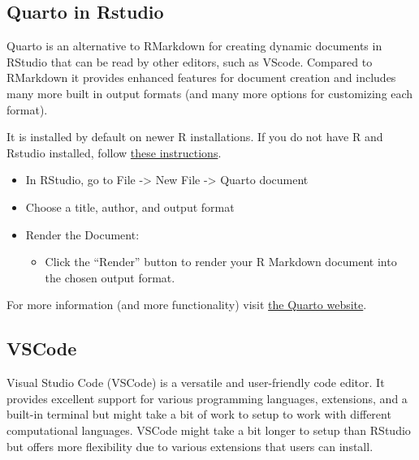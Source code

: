 \documentclass[
  letterpaper,
  DIV=11,
  numbers=noendperiod]{scrreprt}
\providecommand{\tightlist}{%
  \setlength{\itemsep}{0pt}\setlength{\parskip}{0pt}}
\begin{document}
\subsection{Quarto in Rstudio}\label{quarto-in-rstudio}

Quarto is an alternative to RMarkdown for creating dynamic documents in
RStudio that can be read by other editors, such as VScode. Compared to
RMarkdown it provides enhanced features for document creation and
includes many more built in output formats (and many more options for
customizing each format).

It is installed by default on newer R installations. If you do not have
R and Rstudio installed, follow
\href{https://rstudio-education.github.io/hopr/starting.html}{these
instructions}.

\begin{itemize}
\tightlist
\item
  In RStudio, go to File -\textgreater{} New File -\textgreater{} Quarto
  document
\item
  Choose a title, author, and output format
\item
  Render the Document:

  \begin{itemize}
  \tightlist
  \item
    Click the ``Render'' button to render your R Markdown document into
    the chosen output format.
  \end{itemize}
\end{itemize}

For more information (and more functionality) visit
\href{https://quarto.org/docs/get-started/hello/rstudio.html}{the Quarto
website}.

\subsection{VSCode}\label{vscode}

Visual Studio Code (VSCode) is a versatile and user-friendly code
editor. It provides excellent support for various programming languages,
extensions, and a built-in terminal but might take a bit of work to
setup to work with different computational languages. VSCode might take
a bit longer to setup than RStudio but offers more flexibility due to
various extensions that users can install.
\end{document}
